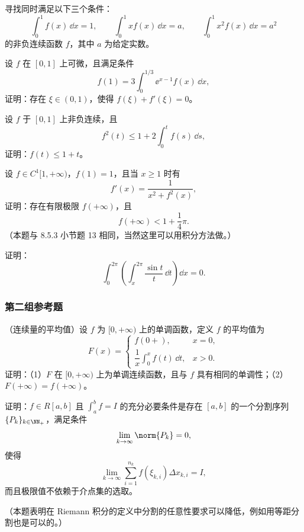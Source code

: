 \begin{xreferenceproblem}[21]
寻找同时满足以下三个条件：
\[
  \int_0^1 f(x)\,\dd x=1,
  \qquad
  \int_0^1xf(x)\,\dd x=a,
  \qquad
  \int_0^1x^2f(x)\,\dd x=a^2
\]
的非负连续函数 $f$，其中 $a$ 为给定实数。
\end{xreferenceproblem}

\begin{xreferenceproblem}[22]
设 $f$ 在 $[0,1]$ 上可微，且满足条件
\[
  f(1)=3\int_0^{1/3}\ee^{x-1}f(x)\,\dd x,
\]
证明：存在 $\xi\in(0,1)$，使得 $f(\xi)+f'(\xi)=0$。
\end{xreferenceproblem}

\begin{xreferenceproblem}[23]
设 $f$ 于 $[0,1]$ 上非负连续，且
\[
  f^2(t)\leqslant1+2\int_0^t f(s)\,\dd s,
\]
证明：$f(t)\leqslant1+t$。
\end{xreferenceproblem}

\begin{xreferenceproblem}[24]
设 $f\in C^1[1,+\infty)$，$f(1)=1$，且当 $x\geqslant1$ 时有
\[
  f'(x)=\frac1{x^2+f^2(x)},
\]
证明：存在有限极限 $f(+\infty)$，且
\[
  f(+\infty)<1+\frac14\pi.
\]
（本题与 8.5.3 小节题 13 相同，当然这里可以用积分方法做。）
\end{xreferenceproblem}

\begin{xreferenceproblem}[25]
证明：
\[
  \int_0^{2\pi}\left(\int_x^{2\pi}\frac{\sin t}{t}\,\dd t\right)\dd x=0.
\]
\end{xreferenceproblem}

\subsubsection*{第二组参考题}

\begin{xreferenceproblem}[1]
（连续量的平均值）设 $f$ 为 $[0,+\infty)$ 上的单调函数，定义 $f$ 的平均值为
\[
  F(x)=
  \begin{cases}
    f(0+),&x=0,\\[4pt]
    \dfrac1x\displaystyle\int_0^x f(t)\,\dd t,&x>0.
  \end{cases}
\]
证明：（1）$F$ 在 $[0,+\infty)$ 上为单调连续函数，且与 $f$ 具有相同的单调性；（2）$F(+\infty)=f(+\infty)$。
\end{xreferenceproblem}

\begin{xreferenceproblem}[2]
证明：$f\in R[a,b]$ 且 $\int_a^b f=I$ 的充分必要条件是存在 $[a,b]$ 的一个分割序列 $\{P_k\}_{k\in\NN_+}$，满足条件
\[
  \lim_{k\to\infty}\norm{P_k}=0,
\]
使得
\[
  \lim_{k\to\infty}\sum_{i=1}^{n_k}f(\xi_{k,i})\Delta x_{k,i}=I,
\]
而且极限值不依赖于介点集的选取。

（本题表明在 Riemann 积分的定义中分割的任意性要求可以降低，例如用等距分割也是可以的。）
\end{xreferenceproblem}

